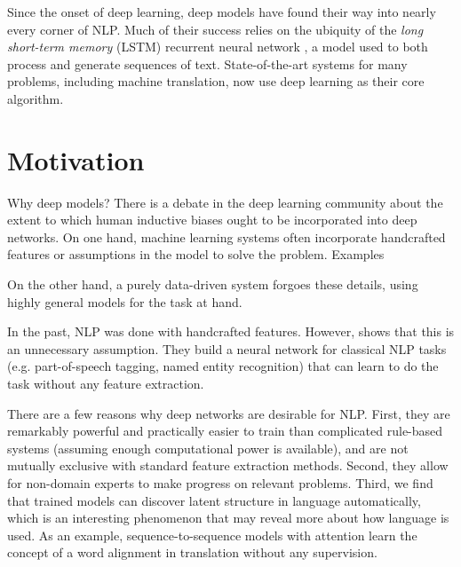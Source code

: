 \documentclass[11pt]{report}
\begin{document}

Since the onset of deep learning, deep models have found their way into nearly every corner of NLP. Much of their success relies on the ubiquity of the \emph{long short-term memory} (LSTM) recurrent neural network \citep{hochreiter1997long}, a model used to both process and generate sequences of text. State-of-the-art systems for many problems, including machine translation, now use deep learning as their core algorithm. %



\section{Motivation}


Why deep models? There is a debate in the deep learning community about the extent to which human inductive biases ought to be incorporated into deep networks. On one hand, machine learning systems often incorporate handcrafted features or assumptions in the model to solve the problem. Examples %

On the other hand, a purely data-driven system forgoes these details, using highly general models for the task at hand.

In the past, NLP was done with handcrafted features. However, \citet{Collobert2011} shows that this is an unnecessary assumption. They build a neural network for classical NLP tasks (e.g. part-of-speech tagging, named entity recognition) that can learn to do the task without any feature extraction.


There are a few reasons why deep networks are desirable for NLP. First, they are remarkably powerful and practically easier to train than complicated rule-based systems (assuming enough computational power is available), and are not mutually exclusive with standard feature extraction methods.
Second, they allow for non-domain experts to make progress on relevant problems.
Third, we find that trained models can discover latent structure in language automatically, which is an interesting phenomenon that may reveal more about how language is used. As an example, sequence-to-sequence models with attention \citep{bahdanau2014neural} learn the concept of a word alignment in translation without any supervision.
\end{document}

